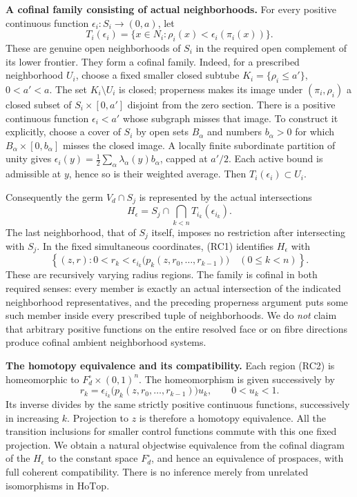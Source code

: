 \documentclass[11pt,a4paper]{article}
\theoremstyle{definition}
\begin{document}
\textbf{A cofinal family consisting of actual neighborhoods.} For every positive continuous function \(\epsilon_i:S_i\to(0,a)\), let
\[
 T_i(\epsilon_i)=
 \{x\in N_i:\rho_i(x)<\epsilon_i(\pi_i(x))\}.
\]
These are genuine open neighborhoods of \(S_i\) in the required open complement of its lower frontier. They form a cofinal family. Indeed, for a prescribed neighborhood \(U_i\), choose a fixed smaller closed subtube \(K_i=\{\rho_i\le a'\}\), \(0<a'<a\). The set \(K_i\setminus U_i\) is closed; properness makes its image under \((\pi_i,\rho_i)\) a closed subset of \(S_i\times[0,a']\) disjoint from the zero section. There is a positive continuous function \(\epsilon_i<a'\) whose subgraph misses that image. To construct it explicitly, choose a cover of \(S_i\) by open sets \(B_\alpha\) and numbers \(b_\alpha>0\) for which \(B_\alpha\times[0,b_\alpha]\) misses the closed image. A locally finite subordinate partition of unity gives \(\epsilon_i(y)=\frac12\sum_\alpha\lambda_\alpha(y)b_\alpha\), capped at \(a'/2\). Each active bound is admissible at \(y\), hence so is their weighted average. Then \(T_i(\epsilon_i)\subset U_i\).

Consequently the germ \(V_d\cap S_j\) is represented by the actual intersections
\[
 H_\epsilon=S_j\cap\bigcap_{k<n}T_{i_k}(\epsilon_{i_k}).
\]
The last neighborhood, that of \(S_j\) itself, imposes no restriction after intersecting with \(S_j\). In the fixed simultaneous coordinates, (RC1) identifies \(H_\epsilon\) with
\[
 \left\{(z,r):
 0<r_k<\epsilon_{i_k}\bigl(p_k(z,r_0,\ldots,r_{k-1})\bigr)
 \quad(0\le k<n)\right\}.\tag{RC2}
\]
These are recursively varying radius regions. The family is cofinal in both required senses: every member is exactly an actual intersection of the indicated neighborhood representatives, and the preceding properness argument puts some such member inside every prescribed tuple of neighborhoods. We do \emph{not} claim that arbitrary positive functions on the entire resolved face or on fibre directions produce cofinal ambient neighborhood systems.

\textbf{The homotopy equivalence and its compatibility.} Each region (RC2) is homeomorphic to \(F_d^\circ\times(0,1)^n\). The homeomorphism is given successively by
\[
 r_k=\epsilon_{i_k}\bigl(p_k(z,r_0,\ldots,r_{k-1})\bigr)u_k,
 \qquad 0<u_k<1.
\]
Its inverse divides by the same strictly positive continuous functions, successively in increasing \(k\). Projection to \(z\) is therefore a homotopy equivalence. All the transition inclusions for smaller control functions commute with this one fixed projection. We obtain a natural objectwise equivalence from the cofinal diagram of the \(H_\epsilon\) to the constant space \(F_d^\circ\), and hence an equivalence of prospaces, with full coherent compatibility. There is no inference merely from unrelated isomorphisms in \(\mathrm{HoTop}\).
\end{document}
